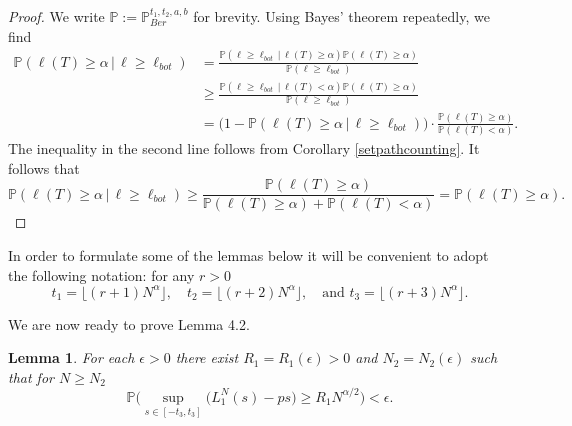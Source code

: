 \documentclass[12pt]{article}
\newtheorem{lemma}{Lemma}
\begin{document}
	\begin{proof}
		We write $\mathbb{P} := \mathbb{P}^{t_1,t_2,a,b}_{Ber}$ for brevity. Using Bayes' theorem repeatedly, we find
		\begin{align*}
		\mathbb{P}(\ell(T)\geq\alpha\,|\,\ell \geq \ell_{bot}) &= \frac{\mathbb{P}(\ell \geq \ell_{bot}\,|\,\ell(T)\geq\alpha) \mathbb{P}(\ell(T)\geq\alpha)}{\mathbb{P}(\ell \geq \ell_{bot})}\\ 
		&\geq \frac{\mathbb{P}(\ell \geq \ell_{bot}\,|\,\ell(T) < \alpha) \mathbb{P}(\ell(T)\geq\alpha)}{\mathbb{P}(\ell \geq \ell_{bot})}\\
		&= \big(1 - \mathbb{P}(\ell(T)\geq\alpha\,|\,\ell \geq \ell_{bot})\big)\cdot\frac{\mathbb{P}(\ell(T)\geq\alpha)}{\mathbb{P}(\ell(T) < \alpha)}.
		\end{align*}
		The inequality in the second line follows from Corollary \ref{setpathcounting}. It follows that
		\[
		\mathbb{P}(\ell(T)\geq\alpha\,|\,\ell \geq \ell_{bot}) \geq \frac{\mathbb{P}(\ell(T)\geq\alpha)}{\mathbb{P}(\ell(T)\geq\alpha) + \mathbb{P}(\ell(T) < \alpha)} = \mathbb{P}(\ell(T)\geq\alpha).
		\]
	\end{proof}

	In order to formulate some of the lemmas below it will be convenient to adopt the following notation: for any $r > 0$
	\begin{equation*}\label{eqsts}
	t_1 =\lfloor (r+1) N^{\alpha} \rfloor,\quad t_2 = \lfloor (r+2)N^{\alpha} \rfloor,\quad \textrm{and } t_3 = \lfloor (r+3)N^{\alpha} \rfloor.
	\end{equation*}
	
	We are now ready to prove Lemma 4.2.

	\begin{lemma}
		For each $\epsilon > 0$ there exist $R_1=R_1(\epsilon) > 0$ and $N_2= N_2(\epsilon)$ such that for $N \geq N_2$ 
		$$\mathbb{P}\Big( \sup_{s \in [ -t_3, t_3] }\big( L^N_1(s) - p s \big) \geq  R_1N^{\alpha/2} \Big) < \epsilon.$$
	\end{lemma}
\end{document}
